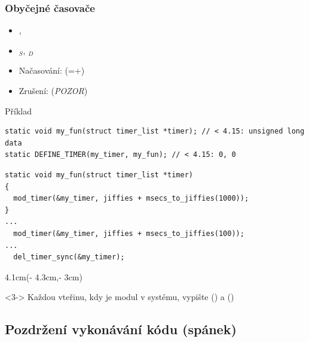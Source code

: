 \begin{frame}[fragile]
  \frametitle{Obyčejné časovače}

  \begin{itemize}
    \item {}, 
    \item {}$_S$, $_D$

    \pause

    \item Načasování:  (=+)
    \item Zrušení:  (\emph{POZOR})
  \end{itemize}


  \begin{block}{Příklad}
    \begin{lstlisting}[aboveskip=2pt,belowskip=0pt]
static void my_fun(struct timer_list *timer); // < 4.15: unsigned long data
static DEFINE_TIMER(my_timer, my_fun); // < 4.15: 0, 0
    \end{lstlisting}
    \begin{lstlisting}[aboveskip=0pt,belowskip=2pt]
static void my_fun(struct timer_list *timer)
{
  mod_timer(&my_timer, jiffies + msecs_to_jiffies(1000));
}
...
  mod_timer(&my_timer, jiffies + msecs_to_jiffies(100));
...
  del_timer_sync(&my_timer);
    \end{lstlisting}
  \end{block}

  \begin{textblock*}{4.1cm}(\textwidth - 4.3cm,\textheight - 3cm)
    \begin{onlyenv}<3->
       Každou vteřinu, kdy je modul v systému, vypište 
	() a  ()
    \end{onlyenv}
  \end{textblock*}

\end{frame}

\iffimuni
\subsection{Pozdržení vykonávání kódu (spánek)}
\fi

